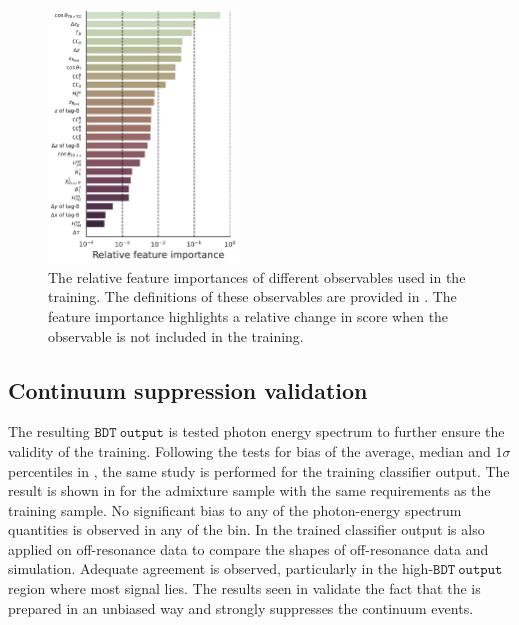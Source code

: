 \begin{figure}[htbp!]
    \centering
    \includegraphics[width=0.45\textwidth]{figures/continuum_suppression/feature_importance.pdf}
    \caption{\label{fig:feature_importance} The relative feature importances of different observables used in the training.
    The definitions of these observables are provided in .
    The feature importance highlights a relative change in \AUC score when the observable is not included in the training.
    }
\end{figure}

\subsection{Continuum suppression validation}\label{sec:continuum_validation}

The resulting $\mathtt{BDT~output}$ is tested photon energy spectrum to further ensure the validity of the training.
Following the tests for bias of the average, median and $1\sigma$ percentiles in ,
the same study is performed for the training classifier output.
The result is shown in  for the \BtoXsgamma admixture sample with the same requirements as the training sample.
No significant bias to any of the photon-energy spectrum quantities is observed in any of the bin.
In  the trained classifier output is also applied on off-resonance data to compare the shapes of off-resonance data and simulation.
Adequate agreement is observed, particularly in the high-$\mathtt{BDT~output}$ region where most signal lies.
The results seen in  validate the fact that the \BDT is prepared in an unbiased way and strongly suppresses the continuum events.

